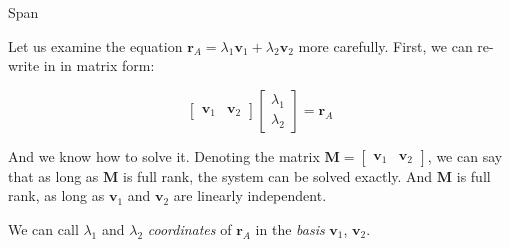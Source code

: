 \documentclass{beamer}
\begin{document}
\begin{frame}{Span}
	\begin{flushleft}
		
	Let us examine the equation $\mathbf r_A = \lambda_1 \mathbf v_1 + \lambda_2 \mathbf v_2$ more carefully. First, we can re-write in in matrix form:
	
	\begin{equation}
		\begin{bmatrix}
			\mathbf v_1 & \mathbf v_2
		\end{bmatrix}
		\begin{bmatrix}
			\lambda_1 \\ \lambda_2
		\end{bmatrix}
		=
		\mathbf r_A
	\end{equation}

\bigskip	

	And we know how to solve it. Denoting the matrix $\mathbf M = \begin{bmatrix}
		\mathbf v_1 & \mathbf v_2
	\end{bmatrix}$, we can say that as long as $\mathbf M$ is full rank, the system can be solved exactly. And $\mathbf M$ is full rank, as long as $\mathbf v_1$ and $\mathbf v_2$ are linearly independent.

\bigskip	

	We can call $\lambda_1$ and $\lambda_2$ \emph{coordinates} of $\mathbf r_A$ in the \emph{basis} $\mathbf v_1$, $\mathbf v_2$.

		
	\end{flushleft}
\end{frame}
\end{document}
